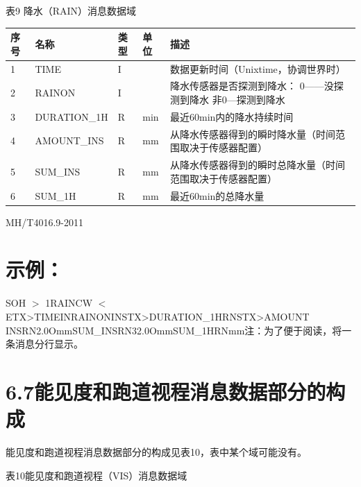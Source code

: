 \documentclass[
  10
]{article}
\begin{document}
表9 降水（RAIN）消息数据域

\begin{longtable}[]{@{}|l|l|l|l|l|@{}}
\toprule\noalign{}
\endhead
\bottomrule\noalign{}
\endlastfoot
\hline
序号 & 名称 & 类型 & 单位 & 描述 \\
\hline
1 & TIME & I & & 数据更新时间（Unixtime，协调世界时） \\
\hline
2 & RAINON & I & & 降水传感器是否探测到降水： 0------没探测到降水
非0---探测到降水 \\
\hline
3 & DURATION\_1H & R & min & 最近60min内的降水持续时间 \\
\hline
4 & AMOUNT\_INS & R & mm &
从降水传感器得到的瞬时降水量（时间范围取决于传感器配置） \\
\hline
5 & SUM\_INS & R & mm &
从降水传感器得到的瞬时总降水量（时间范围取决于传感器配置） \\
\hline
6 & SUM\_1H & R & mm & 最近60min的总降水量 \\
\hline
\end{longtable}

MH/T4016.9-2011

\section{示例：}\label{ux793aux4f8b-3}

SOH \(>\) 1\textbar\textbar RAIN\textbar CW \(<\)
ETX\textgreater TIME\textbar I\textbar N\textbar RAINON\textbar IN\textbar STX\textgreater DURATION\_1H\textbar R\textbar N\textbar STX\textgreater AMOUNT
INS\textbar R\textbar N\textbar2.0O\textbar mmSUM\_INS\textbar RN\textbar32.0O\textbar mmSUM\_1H\textbar R\textbar N\textbar mm注：为了便于阅读，将一条消息分行显示。

\section{6.7能见度和跑道视程消息数据部分的构成}\label{ux80fdux89c1ux5ea6ux548cux8dd1ux9053ux89c6ux7a0bux6d88ux606fux6570ux636eux90e8ux5206ux7684ux6784ux6210}

能见度和跑道视程消息数据部分的构成见表10，表中某个域可能没有。

表10能见度和跑道视程（VIS）消息数据域
\end{document}
